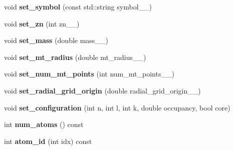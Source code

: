 \begin{DoxyCompactItemize}
\item 
\hypertarget{classsirius_1_1_atom__type_aadae8b71a5a3405307fd38552534c73a}{}void {\bfseries set\+\_\+symbol} (const std\+::string symbol\+\_\+\+\_\+)\label{classsirius_1_1_atom__type_aadae8b71a5a3405307fd38552534c73a}

\item 
\hypertarget{classsirius_1_1_atom__type_a25e33547e592eebc0e52074e1ddeea8e}{}void {\bfseries set\+\_\+zn} (int zn\+\_\+\+\_\+)\label{classsirius_1_1_atom__type_a25e33547e592eebc0e52074e1ddeea8e}

\item 
\hypertarget{classsirius_1_1_atom__type_aaa9436c259fe168fafc1eb64ea373384}{}void {\bfseries set\+\_\+mass} (double mass\+\_\+\+\_\+)\label{classsirius_1_1_atom__type_aaa9436c259fe168fafc1eb64ea373384}

\item 
\hypertarget{classsirius_1_1_atom__type_a09574d55b53c902af401e625b2bbfb9f}{}void {\bfseries set\+\_\+mt\+\_\+radius} (double mt\+\_\+radius\+\_\+\+\_\+)\label{classsirius_1_1_atom__type_a09574d55b53c902af401e625b2bbfb9f}

\item 
\hypertarget{classsirius_1_1_atom__type_a82e63b146d3d7ecdb404e8026dbb9ff3}{}void {\bfseries set\+\_\+num\+\_\+mt\+\_\+points} (int num\+\_\+mt\+\_\+points\+\_\+\+\_\+)\label{classsirius_1_1_atom__type_a82e63b146d3d7ecdb404e8026dbb9ff3}

\item 
\hypertarget{classsirius_1_1_atom__type_a2be0a994019192e4a7c30db68cd2a9ca}{}void {\bfseries set\+\_\+radial\+\_\+grid\+\_\+origin} (double radial\+\_\+grid\+\_\+origin\+\_\+\+\_\+)\label{classsirius_1_1_atom__type_a2be0a994019192e4a7c30db68cd2a9ca}

\item 
\hypertarget{classsirius_1_1_atom__type_abefdda5c82140f5476315d3a9c700ad6}{}void {\bfseries set\+\_\+configuration} (int n, int l, int k, double occupancy, bool core)\label{classsirius_1_1_atom__type_abefdda5c82140f5476315d3a9c700ad6}

\item 
\hypertarget{classsirius_1_1_atom__type_a61631cbcdeae6c83993bb62069ce768f}{}int {\bfseries num\+\_\+atoms} () const \label{classsirius_1_1_atom__type_a61631cbcdeae6c83993bb62069ce768f}

\item 
\hypertarget{classsirius_1_1_atom__type_a73b9be4714e851c4cef4d060c3d62792}{}int {\bfseries atom\+\_\+id} (int idx) const \label{classsirius_1_1_atom__type_a73b9be4714e851c4cef4d060c3d62792}


\end{DoxyCompactItemize}
